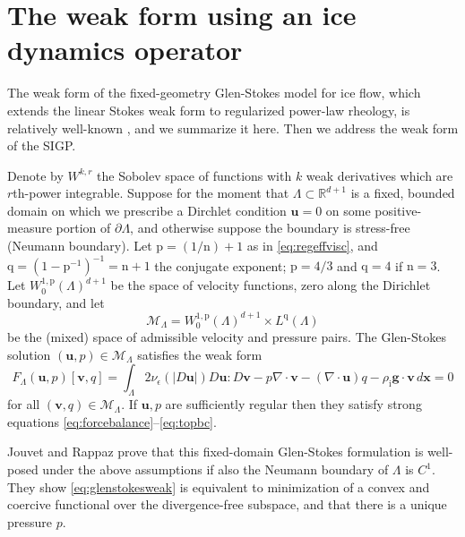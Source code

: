 \documentclass[letterpaper,final,12pt,reqno]{amsart}
\theoremstyle{claim}
\newcommand{\eps}{\epsilon}
\newcommand{\RR}{\mathbb{R}}
\newcommand{\Div}{\nabla\cdot}
\newcommand{\bg}{\mathbf{g}}
\newcommand{\bu}{\mathbf{u}}
\newcommand{\bv}{\mathbf{v}}
\newcommand{\bx}{\mathbf{x}}
\newcommand{\rhoi}{\rho_{\text{i}}}
\newcommand{\nn}{{\text{n}}}
\newcommand{\pp}{{\text{p}}}
\newcommand{\qq}{{\text{q}}}
\numberwithin{equation}{section}
\numberwithin{figure}{section}
\numberwithin{table}{section}
\numberwithin{theorem}{section}
\begin{document}
\section{The weak form using an ice dynamics operator} \label{sec:weakido}

The weak form of the fixed-geometry Glen-Stokes model for ice flow, which extends the linear Stokes weak form \cite{Elmanetal2014} to regularized power-law rheology, is relatively well-known \cite{IsaacStadlerGhattas2015,JouvetRappaz2011,Lengetal2012}, and we summarize it here.  Then we address the weak form of the SIGP.

Denote by $W^{k,r}$ the Sobolev space \cite{Evans2010} of functions with $k$ weak derivatives which are $r$th-power integrable.  Suppose for the moment that $\Lambda \subset \RR^{d+1}$ is a fixed, bounded domain on which we prescribe a Dirchlet condition $\bu=0$ on some positive-measure portion of $\partial\Lambda$, and otherwise suppose the boundary is stress-free (Neumann boundary).  Let $\pp=(1/\nn)+1$ as in \eqref{eq:regeffvisc}, and $\qq=(1-\pp^{-1})^{-1}=\nn+1$ the conjugate exponent; $\pp=4/3$ and $\qq = 4$ if $\nn=3$.  Let $W_0^{1,\pp}(\Lambda)^{d+1}$ be the space of velocity functions, zero along the Dirichlet boundary, and let
\begin{equation}
\mathcal{M}_\Lambda = W_0^{1,\pp}(\Lambda)^{d+1} \times L^\qq(\Lambda)  \label{eq:mixed}
\end{equation}
be the (mixed) space of admissible velocity and pressure pairs.  The Glen-Stokes solution $(\bu,p) \in \mathcal{M}_\Lambda$ satisfies the weak form
\begin{equation}
F_\Lambda(\bu,p)[\bv,q] = \int_\Lambda 2 \nu_\eps(|D\bu|) D\bu : D\bv - p \Div\bv - (\Div\bu) q - \rhoi \bg \cdot \bv\,d\bx = 0 \label{eq:glenstokesweak}
\end{equation}
for all $(\bv,q) \in \mathcal{M}_\Lambda$.  If $\bu,p$ are sufficiently regular then they satisfy strong equations \eqref{eq:forcebalance}--\eqref{eq:topbc}.

Jouvet and Rappaz \cite{JouvetRappaz2011} prove that this fixed-domain Glen-Stokes formulation is well-posed under the above assumptions if also the Neumann boundary of $\Lambda$ is $C^1$.  They show \eqref{eq:glenstokesweak} is equivalent to minimization of a convex and coercive functional over the divergence-free subspace, and that there is a unique pressure $p$.
\end{document}
